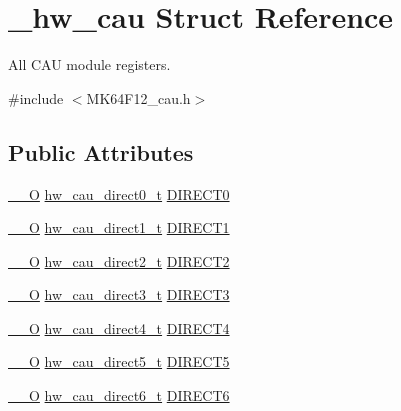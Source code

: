 \hypertarget{struct__hw__cau}{}\section{\+\_\+hw\+\_\+cau Struct Reference}
\label{struct__hw__cau}


All C\+AU module registers.  




{\ttfamily \#include $<$M\+K64\+F12\+\_\+cau.\+h$>$}

\subsection*{Public Attributes}
\begin{DoxyCompactItemize}
\item 
\hyperlink{core__sc300_8h_a7e25d9380f9ef903923964322e71f2f6}{\+\_\+\+\_\+O} \hyperlink{union__hw__cau__direct0}{hw\+\_\+cau\+\_\+direct0\+\_\+t} \hyperlink{struct__hw__cau_a0678085a1eb5ee8ca79b1d0e0aa6a6c9}{D\+I\+R\+E\+C\+T0}
\item 
\hyperlink{core__sc300_8h_a7e25d9380f9ef903923964322e71f2f6}{\+\_\+\+\_\+O} \hyperlink{union__hw__cau__direct1}{hw\+\_\+cau\+\_\+direct1\+\_\+t} \hyperlink{struct__hw__cau_adb2390900301203661b50af09a50df9f}{D\+I\+R\+E\+C\+T1}
\item 
\hyperlink{core__sc300_8h_a7e25d9380f9ef903923964322e71f2f6}{\+\_\+\+\_\+O} \hyperlink{union__hw__cau__direct2}{hw\+\_\+cau\+\_\+direct2\+\_\+t} \hyperlink{struct__hw__cau_a12dd9b41ee7760f7da58cbd186a69690}{D\+I\+R\+E\+C\+T2}
\item 
\hyperlink{core__sc300_8h_a7e25d9380f9ef903923964322e71f2f6}{\+\_\+\+\_\+O} \hyperlink{union__hw__cau__direct3}{hw\+\_\+cau\+\_\+direct3\+\_\+t} \hyperlink{struct__hw__cau_a6b2b193ac1edf47d33b27544da8e505d}{D\+I\+R\+E\+C\+T3}
\item 
\hyperlink{core__sc300_8h_a7e25d9380f9ef903923964322e71f2f6}{\+\_\+\+\_\+O} \hyperlink{union__hw__cau__direct4}{hw\+\_\+cau\+\_\+direct4\+\_\+t} \hyperlink{struct__hw__cau_a543dc9717837533c5b10294e5226a3a4}{D\+I\+R\+E\+C\+T4}
\item 
\hyperlink{core__sc300_8h_a7e25d9380f9ef903923964322e71f2f6}{\+\_\+\+\_\+O} \hyperlink{union__hw__cau__direct5}{hw\+\_\+cau\+\_\+direct5\+\_\+t} \hyperlink{struct__hw__cau_a722c01b30411f6c16c483a0038df86c5}{D\+I\+R\+E\+C\+T5}
\item 
\hyperlink{core__sc300_8h_a7e25d9380f9ef903923964322e71f2f6}{\+\_\+\+\_\+O} \hyperlink{union__hw__cau__direct6}{hw\+\_\+cau\+\_\+direct6\+\_\+t} \hyperlink{struct__hw__cau_ae031d2acb5b699611229f6c02a1a20ea}{D\+I\+R\+E\+C\+T6}

\end{DoxyCompactItemize}
